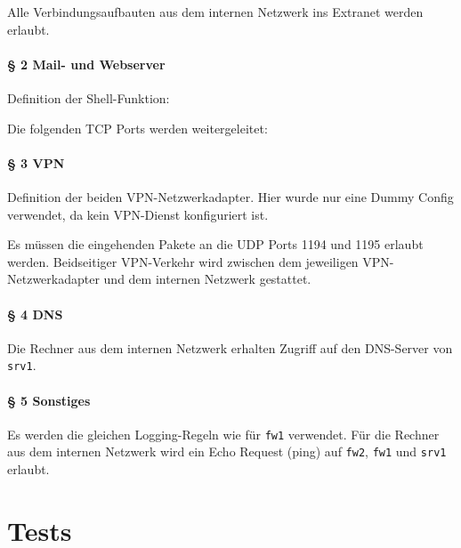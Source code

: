 \noindent Alle Verbindungsaufbauten aus dem internen Netzwerk ins Extranet
werden erlaubt.



\paragraph{§ 2 Mail- und Webserver}

Definition der Shell-Funktion:


\noindent Die folgenden TCP Ports werden weitergeleitet:


\paragraph{§ 3 VPN}

Definition der beiden VPN-Netzwerkadapter. Hier wurde nur eine Dummy Config
verwendet, da kein VPN-Dienst konfiguriert ist.


\noindent Es müssen die eingehenden Pakete an die UDP Ports 1194 und 1195
erlaubt werden.
Beidseitiger VPN-Verkehr wird zwischen dem jeweiligen VPN-Netzwerkadapter
und dem internen Netzwerk gestattet.


\paragraph{§ 4 DNS}

Die Rechner aus dem internen Netzwerk erhalten Zugriff auf den DNS-Server
von {\tt srv1}.


\paragraph{§ 5 Sonstiges}

Es werden die gleichen Logging-Regeln wie für {\tt fw1} verwendet.
Für die Rechner aus dem internen Netzwerk wird
ein Echo Request (ping) auf {\tt fw2}, {\tt fw1} und {\tt srv1} erlaubt.




\newpage
\section{Tests}\label{sec.tests}

